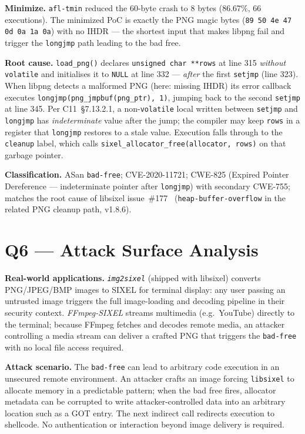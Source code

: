 \documentclass[letterpaper,twocolumn,10pt]{article}
\begin{document}
\textbf{Minimize.} \texttt{afl-tmin} reduced the 60-byte crash to 8 bytes
(86.67\%, 66 executions). The minimized PoC is exactly the PNG magic bytes
(\texttt{89 50 4e 47 0d 0a 1a 0a}) with no IHDR --- the shortest input that
makes libpng fail and trigger the \texttt{longjmp} path leading to the bad free.

\textbf{Root cause.} \texttt{load\_png()} declares \texttt{unsigned char **rows}
at line 315 \emph{without} \texttt{volatile} and initialises it to \texttt{NULL}
at line 332 --- \emph{after} the first \texttt{setjmp} (line 323). When libpng
detects a malformed PNG (here: missing IHDR) its error callback executes
\texttt{longjmp(png\_jmpbuf(png\_ptr), 1)}, jumping back to the second
\texttt{setjmp} at line 345. Per C11~\S7.13.2.1, a non-\texttt{volatile} local
written between \texttt{setjmp} and \texttt{longjmp} has \emph{indeterminate}
value after the jump; the compiler may keep \texttt{rows} in a register that
\texttt{longjmp} restores to a stale value. Execution falls through to the
\texttt{cleanup} label, which calls \texttt{sixel\_allocator\_free(allocator,
rows)} on that garbage pointer.

\textbf{Classification.} ASan \texttt{bad-free}; CVE-2020-11721; CWE-825 (Expired Pointer
Dereference --- indeterminate pointer after \texttt{longjmp}) with secondary
CWE-755; matches the root cause of libsixel issue~\#177~\cite{issue177}
(\texttt{heap-buffer-overflow} in the related PNG cleanup path, v1.8.6).

\section{Q6 --- Attack Surface Analysis}

\textbf{Real-world applications.} \emph{\texttt{img2sixel}} (shipped with
libsixel) converts PNG/JPEG/BMP images to SIXEL for terminal display: any user
passing an untrusted image triggers the full image-loading and decoding
pipeline in their security context. \emph{FFmpeg-SIXEL} streams multimedia
(e.g.\ YouTube) directly to the terminal; because FFmpeg fetches and decodes
remote media, an attacker controlling a media stream can deliver a crafted PNG
that triggers the \texttt{bad-free} with no local file access required.

\textbf{Attack scenario.} The \texttt{bad-free} can lead to arbitrary code
execution in an unsecured remote environment. An attacker crafts an image
forcing \texttt{libsixel} to allocate memory in a predictable pattern; when
the bad free fires, allocator metadata can be corrupted to write
attacker-controlled data into an arbitrary location such as a GOT entry. The
next indirect call redirects execution to shellcode. No authentication or
interaction beyond image delivery is required.
\end{document}
